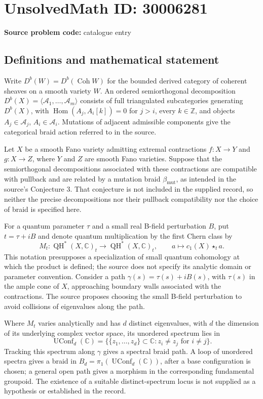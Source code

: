 \documentclass[11pt]{article}
\newcommand{\Z}{\mathbb{Z}}
\newcommand{\C}{\mathbb{C}}
\begin{document}
\section*{UnsolvedMath ID: 30006281}
\textbf{Source problem code:} catalogue entry
\subsection{Definitions and mathematical statement}
Write \(D^b(W)=D^b(\operatorname{Coh}W)\) for the bounded derived category of coherent sheaves on a smooth variety \(W\). An ordered semiorthogonal decomposition \(D^b(X)=\langle\mathcal A_1,\ldots,\mathcal A_m\rangle\) consists of full triangulated subcategories generating \(D^b(X)\), with \(\operatorname{Hom}(A_j,A_i[k])=0\) for \(j>i\), every \(k\in\Z\), and objects \(A_j\in\mathcal A_j\), \(A_i\in\mathcal A_i\). Mutations of adjacent admissible components give the categorical braid action referred to in the source.

Let \(X\) be a smooth Fano variety admitting extremal contractions \(f:X\to Y\) and \(g:X\to Z\), where \(Y\) and \(Z\) are smooth Fano varieties. Suppose that the semiorthogonal decompositions associated with these contractions are compatible with pullback and are related by a mutation braid \(\beta_{\mathrm{mut}}\), as intended in the source's Conjecture 3. That conjecture is not included in the supplied record, so neither the precise decompositions nor their pullback compatibility nor the choice of braid is specified here.

For a quantum parameter \(\tau\) and a small real B-field perturbation \(B\), put \(t=\tau+iB\) and denote quantum multiplication by the first Chern class by
\[
M_t:\operatorname{QH}^{*}(X,\C)_t\longrightarrow\operatorname{QH}^{*}(X,\C)_t,
\qquad a\longmapsto c_1(X)\star_t a.
\]
This notation presupposes a specialization of small quantum cohomology at which the product is defined; the source does not specify its analytic domain or parameter convention. Consider a path \(\gamma(s)=\tau(s)+iB(s)\), with \(\tau(s)\) in the ample cone of \(X\), approaching boundary walls associated with the contractions. The source proposes choosing the small B-field perturbation to avoid collisions of eigenvalues along the path.

Where \(M_t\) varies analytically and has \(d\) distinct eigenvalues, with \(d\) the dimension of its underlying complex vector space, its unordered spectrum lies in
\[
\operatorname{UConf}_d(\C)=\{\{z_1,\ldots,z_d\}\subset\C:z_i\ne z_j\text{ for }i\ne j\}.
\]
Tracking this spectrum along \(\gamma\) gives a spectral braid path. A loop of unordered spectra gives a braid in \(B_d=\pi_1(\operatorname{UConf}_d(\C))\), after a base configuration is chosen; a general open path gives a morphism in the corresponding fundamental groupoid. The existence of a suitable distinct-spectrum locus is not supplied as a hypothesis or established in the record.
\end{document}
